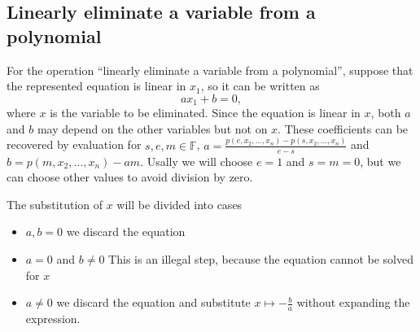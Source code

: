 \subsection*{Linearly eliminate a variable from a polynomial}
For the operation ``linearly eliminate a variable from a polynomial'', suppose that the represented equation is linear in $x_1$, so it can be written as
\[
  a x_1 + b = 0,
\]
where $x$ is the variable to be eliminated. Since the equation is linear in $x$, both $a$ and $b$ may depend on the other variables but not on $x$.
These coefficients can be recovered by evaluation for $s, e, m \in \mathbb{F}$, $a = \frac{p(e, x_2, \dots, x_n) - p(s, x_2, \dots, x_n)}{e - s}$ and $b = p(m, x_2, \dots, x_n) - a m$.
Usally we will choose $e = 1$ and $s = m = 0$, but we can choose other values to avoid division by zero.

The substitution of $x$ will be divided into cases
\begin{itemize}
  \item $a, b = 0$ we discard the equation
  \item $a = 0$ and $b \neq 0$ This is an illegal step, because the equation cannot be solved for $x$
  \item $a \neq 0$ we discard the equation and substitute $x \mapsto -\frac{b}{a}$ without expanding the expression.
\end{itemize}
